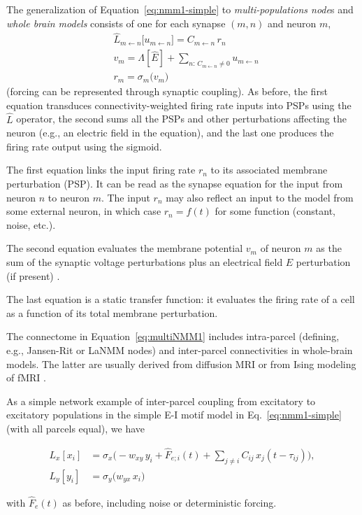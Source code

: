 \documentclass[11pt]{article}
\numberwithin{equation}{section}
\begin{document}
The generalization of Equation~\ref{eq:nmm1-simple} to \textit{multi-populations node}s and \textit{whole brain models }consists of one for each synapse $(m,n)$ and neuron $m$,
\begin{equation}
\begin{aligned}    \label{eq:multiNMM1}
&\hat L_{m\leftarrow n} \big[ u_{m\leftarrow n} \big] = C_{m\leftarrow n} \, r_n \\
&v_m = \Lambda[\hat E] + \sum_{ n:\,C_{m\leftarrow n} \neq 0 } u_{m\leftarrow n}  \\
&r_m = \sigma_m\big(v_m\big) 
\end{aligned}
\end{equation}
(forcing can be represented through synaptic coupling). As before, the first equation transduces connectivity-weighted firing rate inputs into PSPs using the $\hat L$ operator, the second sums all the PSPs and other perturbations affecting the neuron (e.g., an electric field in the equation), and the last one produces the firing rate output using the sigmoid.

The first equation links the input firing rate $r_n$ to its associated membrane perturbation (PSP). It can be read as the synapse equation for the input from neuron $n$ to neuron $m$. The input $r_n$  may also reflect an input to the model from some external neuron, in which case  $ r_n = f(t)$ for some function (constant, noise, etc.). 

The second equation evaluates the membrane potential $v_m$ of neuron $m$ as the sum of the synaptic voltage perturbations plus an electrical field $E$ perturbation (if present) \cite{ruffini_optimization_2014}. 

The last equation is a static transfer function: it evaluates the firing rate of a cell as a function of its total membrane perturbation.

The connectome in Equation~\ref{eq:multiNMM1} includes intra-parcel (defining, e.g., Jansen-Rit or LaNMM nodes) and inter-parcel connectivities in  whole-brain models. The latter are usually derived from diffusion MRI or from Ising modeling of fMRI \cite{mercadalBridgingLocalGlobal2025}.

 As a simple network example of inter-parcel coupling from excitatory to excitatory populations in the simple E-I motif model in Eq.~\ref{eq:nmm1-simple} (with all parcels equal), we have
 \begin{tcolorbox}[
  colback=gray!5,
  colframe=gray!5, %
  boxrule=0pt,
  enhanced, sharp corners,
  left=4pt, right=4pt, top=3pt, bottom=3pt,
  boxsep=2pt,
  before skip=6pt, after skip=6pt
]
\begin{equation} \label{eq:nmm1-coupled-example}
    \begin{aligned}
            L_x[x_i]
              &= \sigma_x\bigl(  - w_{xy}\,y_i + \hat F_{e;i}(t) + \sum_{j\neq i}  C_{ij} \, x_j(t-\tau_{ij}) \bigr),\\
           L_y[y_i] &= \sigma_y\bigl(w_{yx}\,x_i  \bigr) 
          \end{aligned}
\end{equation}
\end{tcolorbox}
with $\hat F_e(t)$ as before, including noise or deterministic forcing. 
\end{document}

